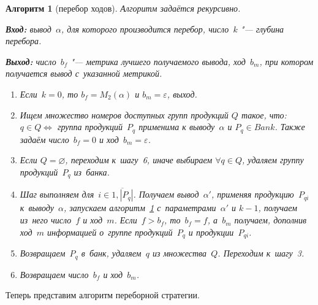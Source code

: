\documentclass{csmathnotes}
\newtheorem{algoritm}{Алгоритм}
\begin{document}
\begin{algoritm}[перебор ходов] Алгоритм задаётся рекурсивно.
	\
	\label{searchalgoritm}
	
	\textbf{Вход:} вывод~$\alpha$, для которого производится перебор, число~$k$ "--- глубина перебора.
	
	\textbf{Выход:} число~$b_f$ "--- метрика лучшего получаемого вывода, ход~$b_m$, при котором получается вывод с~указанной метрикой.
	
	\begin{enumerate}
		\item Если~$k=0$, то $b_f = M_2(\alpha)$ и $b_m = \varepsilon$, выход.
		\item Ищем множество номеров доступных групп продукций $Q$ такое, что: $q \in Q \iff$ группа продукций~$P_q$ применима к выводу~$\alpha$ и $P_q \in Bank$. Также задаём число~$b_f=0$ и ход~$b_m = \varepsilon$.
		\item Если $Q = \varnothing$, переходим к~шагу~6, иначе выбираем $\forall q \in Q$, удаляем группу продукций~$P_q$ из~банка.
		\item Шаг выполняем для~$i \in \overline{1,|P_q|}$. Получаем вывод~$\alpha'$, применяя продукцию~$P_{qi}$ к~выводу~$\alpha$, запускаем алгоритм~\ref{searchalgoritm} с~параметрами~$\alpha'$ и $k-1$, получаем из~него число~$f$ и ход~$m$. Если~$f>b_f$, то~$b_f=f$, а~$b_m$ получаем, дополнив ход~$m$ информацией о~группе продукций~$P_q$ и продукции~$P_{qi}$.
		\item Возвращаем~$P_q$ в~банк, удаляем~$q$ из множества~$Q$. Переходим к~шагу~3.
		\item Возвращаем число~$b_f$ и ход~$b_m$.
	\end{enumerate}
\end{algoritm}

Теперь представим алгоритм переборной стратегии.
\end{document}
